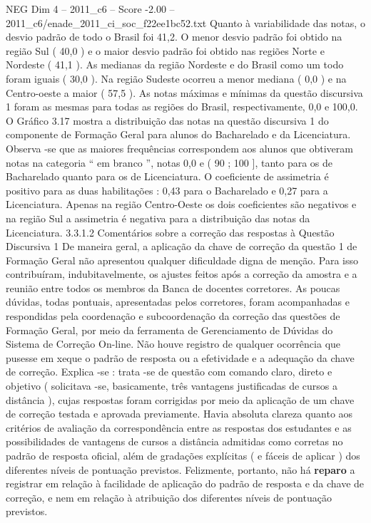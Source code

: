 \begin{textsample}{NEG Dim 4 – 2011\_c6 – Score -2.00 – 2011\_c6/enade\_2011\_ci\_soc\_f22ee1bc52.txt}
Quanto à variabilidade das notas, o desvio padrão de todo o Brasil foi 41,2.
O menor desvio padrão foi obtido na região Sul ( 40,0 ) e o maior desvio padrão foi obtido nas regiões Norte e Nordeste ( 41,1 ).
As medianas da região Nordeste e do Brasil como um todo foram iguais ( 30,0 ).
Na região Sudeste ocorreu a menor mediana ( 0,0 ) e na Centro-oeste a maior ( 57,5 ).
As notas máximas e mínimas da questão discursiva 1 foram as mesmas para todas as regiões do Brasil, respectivamente, 0,0 e 100,0.
O Gráfico 3.17 mostra a distribuição das notas na questão discursiva 1 do componente de Formação Geral para alunos do Bacharelado e da Licenciatura.
Observa -se que as maiores frequências correspondem aos alunos que obtiveram notas na categoria “ em branco ”, notas 0,0 e ( 90 ; 100 ], tanto para os de Bacharelado quanto para os de Licenciatura.
O coeficiente de assimetria é positivo para as duas habilitações : 0,43 para o Bacharelado e 0,27 para a Licenciatura.
Apenas na região Centro-Oeste os dois coeficientes são negativos e na região Sul a assimetria é negativa para a distribuição das notas da Licenciatura. 3.3.1.2 Comentários sobre a correção das respostas à Questão Discursiva 1 De maneira geral, a aplicação da chave de correção da questão 1 de Formação Geral não apresentou qualquer dificuldade digna de menção.
Para isso contribuíram, indubitavelmente, os ajustes feitos após a correção da amostra e a reunião entre todos os membros da Banca de docentes corretores.
As poucas dúvidas, todas pontuais, apresentadas pelos corretores, foram acompanhadas e respondidas pela coordenação e subcoordenação da correção das questões de Formação Geral, por meio da ferramenta de Gerenciamento de Dúvidas do Sistema de Correção On-line.
Não houve registro de qualquer ocorrência que pusesse em xeque o padrão de resposta ou a efetividade e a adequação da chave de correção.
Explica -se : trata -se de questão com comando claro, direto e objetivo ( solicitava -se, basicamente, três vantagens justificadas de cursos a distância ), cujas respostas foram corrigidas por meio da aplicação de um chave de correção testada e aprovada previamente.
Havia absoluta clareza quanto aos critérios de avaliação da correspondência entre as respostas dos estudantes e as possibilidades de vantagens de cursos a distância admitidas como corretas no padrão de resposta oficial, além de gradações explícitas ( e fáceis de aplicar ) dos diferentes níveis de pontuação previstos.
Felizmente, portanto, não há \textbf{reparo} a registrar em relação à facilidade de aplicação do padrão de resposta e da chave de correção, e nem em relação à atribuição dos diferentes níveis de pontuação previstos.

\end{textsample}
